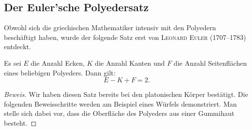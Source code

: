 \documentclass[%
11pt,%
twoside,%
titlepage,%
german,%
headsepline%
]{scrartcl}
\begin{document}
\subsection{Der Euler'sche Polyedersatz}
Obwohl sich die griechischen Mathematiker intensiv mit den Polyedern besch\"aftigt haben, wurde der folgende Satz erst von \textsc{Leonard Euler} (1707--1783) entdeckt.
\begin{csatz}
Es sei $E$ die Anzahl Ecken, $K$ die Anzahl Kanten und $F$ die Anzahl Seitenfl\"achen eines beliebigen Polyeders. Dann gilt:
$$E-K+F=2.$$
\end{csatz}
\begin{proof}[Beweis]
Wir haben diesen Satz bereits bei den platonischen K\"orper best\"atigt. Die folgenden Beweisschritte werden am Beispiel eines W\"urfels demonstriert. Man stelle sich dabei vor, dass die Oberfl\"ache des Polyeders aus einer Gummihaut besteht.


\end{proof}
\end{document}
